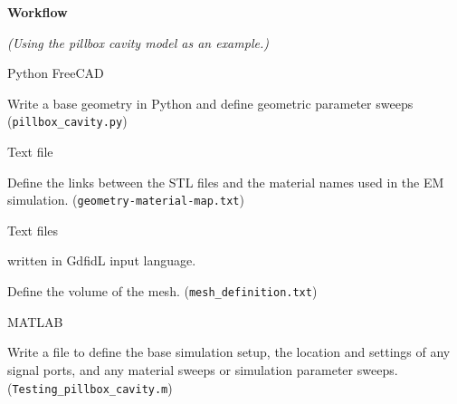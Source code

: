 \documentclass[11pt]{article}
\begin{document}
\begin{center}
\textbf{Workflow}

\emph{(Using the pillbox cavity model as an example.)}
\end{center}
\begin{turn}{45}
\begin{minipage}{0.2\linewidth}
\textcolor[rgb]{0.50,0.50,1.00}{Python FreeCAD}
\end{minipage}
\end{turn}
\begin{minipage}{0.8\linewidth}
Write a base geometry in Python and define geometric parameter sweeps (\verb|pillbox_cavity.py|)
\vspace{10mm}
\end{minipage}

\begin{turn}{45}
\begin{minipage}{0.2\linewidth}
\textcolor[rgb]{0.50,0.50,1.00}{Text file}
\end{minipage}
\end{turn}
\begin{minipage}{0.8\linewidth}
Define the links between the STL files and the material names used in the EM simulation. (\verb|geometry-material-map.txt|)
\vspace{10mm}
\end{minipage}

\begin{turn}{45}
\begin{minipage}{0.2\linewidth}
\textcolor[rgb]{0.50,0.50,1.00}{Text files}

\textcolor[rgb]{0.50,0.50,1.00}{written in GdfidL input language.}
\end{minipage}
\end{turn}
\begin{minipage}{0.6\linewidth}
Define the volume of the mesh. (\verb|mesh_definition.txt|)
\vspace{10mm}
\end{minipage}

\begin{turn}{45}
\begin{minipage}{0.2\linewidth}
\textcolor[rgb]{0.50,0.50,1.00}{MATLAB}
\end{minipage}
\end{turn}
\begin{minipage}{0.8\linewidth}
Write a file to define the base simulation setup, the location and settings of any signal ports, and any material sweeps or simulation parameter sweeps. (\verb|Testing_pillbox_cavity.m|)
\vspace{10mm}
\end{minipage}
\end{document}

